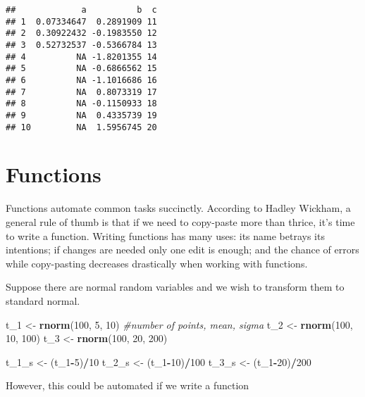 \documentclass[11pt,]{article}
\newenvironment{Shaded}{\begin{snugshade}}{\end{snugshade}}
\newcommand{\KeywordTok}[1]{\textcolor[rgb]{0.13,0.29,0.53}{\textbf{#1}}}
\newcommand{\DecValTok}[1]{\textcolor[rgb]{0.00,0.00,0.81}{#1}}
\newcommand{\StringTok}[1]{\textcolor[rgb]{0.31,0.60,0.02}{#1}}
\newcommand{\CommentTok}[1]{\textcolor[rgb]{0.56,0.35,0.01}{\textit{#1}}}
\newcommand{\OperatorTok}[1]{\textcolor[rgb]{0.81,0.36,0.00}{\textbf{#1}}}
\newcommand{\NormalTok}[1]{#1}
\begin{document}
\begin{verbatim}
##             a          b  c
## 1  0.07334647  0.2891909 11
## 2  0.30922432 -0.1983550 12
## 3  0.52732537 -0.5366784 13
## 4          NA -1.8201355 14
## 5          NA -0.6866562 15
## 6          NA -1.1016686 16
## 7          NA  0.8073319 17
## 8          NA -0.1150933 18
## 9          NA  0.4335739 19
## 10         NA  1.5956745 20
\end{verbatim}

\section{Functions}\label{functions}

Functions automate common tasks succinctly. According to Hadley Wickham,
a general rule of thumb is that if we need to copy-paste more than
thrice, it's time to write a function. Writing functions has many uses:
its name betrays its intentions; if changes are needed only one edit is
enough; and the chance of errors while copy-pasting decreases
drastically when working with functions.

Suppose there are normal random variables and we wish to transform them
to standard normal.

\begin{Shaded}
\begin{Highlighting}[]
\NormalTok{t_}\DecValTok{1}\NormalTok{ <-}\StringTok{ }\KeywordTok{rnorm}\NormalTok{(}\DecValTok{100}\NormalTok{, }\DecValTok{5}\NormalTok{, }\DecValTok{10}\NormalTok{) }\CommentTok{#number of points, mean, sigma}
\NormalTok{t_}\DecValTok{2}\NormalTok{ <-}\StringTok{ }\KeywordTok{rnorm}\NormalTok{(}\DecValTok{100}\NormalTok{, }\DecValTok{10}\NormalTok{, }\DecValTok{100}\NormalTok{)}
\NormalTok{t_}\DecValTok{3}\NormalTok{ <-}\StringTok{ }\KeywordTok{rnorm}\NormalTok{(}\DecValTok{100}\NormalTok{, }\DecValTok{20}\NormalTok{, }\DecValTok{200}\NormalTok{)}

\NormalTok{t_1_s <-}\StringTok{ }\NormalTok{(t_}\DecValTok{1}\OperatorTok{-}\DecValTok{5}\NormalTok{)}\OperatorTok{/}\DecValTok{10} 
\NormalTok{t_2_s <-}\StringTok{ }\NormalTok{(t_}\DecValTok{1}\OperatorTok{-}\DecValTok{10}\NormalTok{)}\OperatorTok{/}\DecValTok{100}
\NormalTok{t_3_s <-}\StringTok{ }\NormalTok{(t_}\DecValTok{1}\OperatorTok{-}\DecValTok{20}\NormalTok{)}\OperatorTok{/}\DecValTok{200}
\end{Highlighting}
\end{Shaded}

However, this could be automated if we write a function
\end{document}
